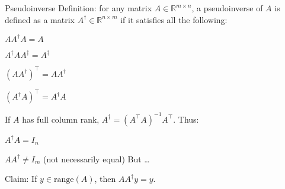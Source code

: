 \begin{frame}{Pseudoinverse}
Definition: for any matrix $A \in \mathbb{R}^{m \times n}$, a pseudoinverse of $A$ is defined as a matrix $A^\dagger \in \mathbb{R}^{n \times m}$ if it satisfies all the following:
\bit
\item $A A^\dagger A = A$
\item $A^\dagger A A^\dagger = A^\dagger$
\item $(A A^\dagger)^\top = A A^\dagger$
\item $(A^\dagger A)^\top = A^\dagger A$

\eit

\pause
\vfill
If $A$ has full column rank, $A^\dagger = (A^\top A)^{-1} A^\top$. Thus:
\bit
\item $A^\dagger A = I_n$
\item $A A^\dagger \neq I_m$ (not necessarily equal)
\eit
But \dots

\pause
\vfill


Claim: If $y \in \text{range}(A)$, then $A A^\dagger y = y$.

\end{frame}
